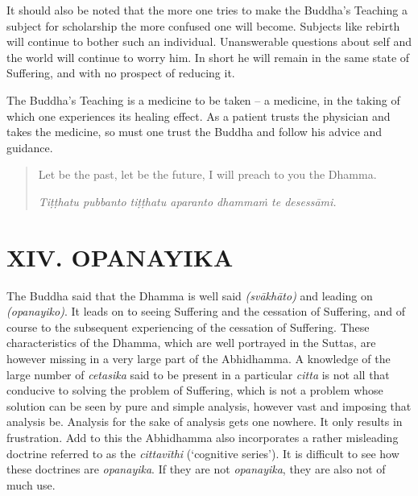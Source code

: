 It should also be noted that the more one tries to make the Buddha's Teaching a subject for scholarship the more confused one will become. Subjects like rebirth will continue to bother such an individual. Unanswerable questions about self and the world will continue to worry him. In short he will remain in the same state of Suffering, and with no prospect of reducing it.

The Buddha's Teaching is a medicine to be taken -- a medicine, in the taking of which one experiences its healing effect. As a patient trusts the physician and takes the medicine, so must one trust the Buddha and follow his advice and guidance.

\begin{quote}
Let be the past, let be the future, I will preach to you the Dhamma.

\emph{Tiṭṭhatu pubbanto tiṭṭhatu aparanto dhammaṁ te desessāmi.}
\end{quote}

\hypertarget{_xiv_opanayika}{%
\section{XIV. OPANAYIKA}\label{_xiv_opanayika}}

The Buddha said that the Dhamma is well said \emph{(svākhāto)} and leading on \emph{(opanayiko)}. It leads on to seeing Suffering and the cessation of Suffering, and of course to the subsequent experiencing of the cessation of Suffering. These characteristics of the Dhamma, which are well portrayed in the Suttas, are however missing in a very large part of the Abhidhamma. A knowledge of the large number of \emph{cetasika} said to be present in a particular \emph{citta} is not all that conducive to solving the problem of Suffering, which is not a problem whose solution can be seen by pure and simple analysis, however vast and imposing that analysis be. Analysis for the sake of analysis gets one nowhere. It only results in frustration. Add to this the Abhidhamma also incorporates a rather misleading doctrine referred to as the \emph{cittavīthi} (`cognitive series'). It is difficult to see how these doctrines are \emph{opanayika}. If they are not \emph{opanayika}, they are also not of much use.
